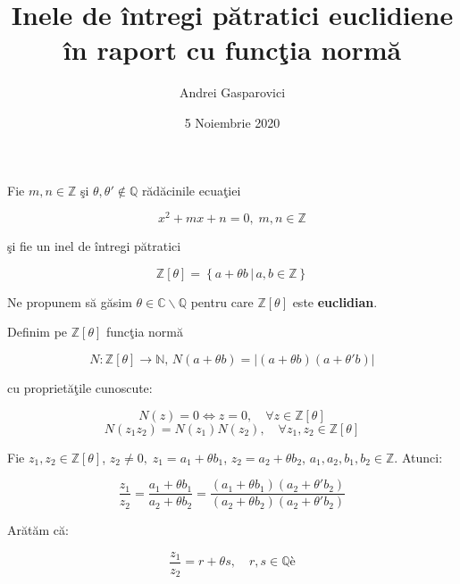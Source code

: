 \documentclass[12pt]{article}
\title{Inele de întregi pătratici euclidiene în raport cu funcţia normă}
\author{Andrei Gasparovici}
\date{5 Noiembrie 2020}
\begin{document}
\maketitle

Fie $m, n \in \mathbb{Z}$ şi $\theta, \theta' \notin \mathbb{Q}$ rădăcinile ecuaţiei

\begin{equation} \label{eq:def_theta}
    x^2 + mx + n = 0, \; m, n \in \mathbb{Z}
\end{equation}

şi fie un inel de întregi pătratici %

\begin{equation} \label{eq:def_z_theta}
    \mathbb{Z}[\theta] = \left\{ a + \theta b \,|\, a, b \in \mathbb{Z}\right\}
\end{equation}

\vspace{.8cm}
Ne propunem să găsim $\theta \in \mathbb{C} \backslash \mathbb{Q}$ pentru care $\mathbb{Z}[\theta]$ este \textbf{euclidian}.
\vspace{.8cm}

Definim pe $\mathbb{Z[\theta]}$ funcţia normă

\begin{equation} \label{eq:def_norm}
    N : \mathbb{Z[\theta]} \to \mathbb{N}, \, N(a + \theta b) = |(a + \theta b)(a + \theta' b)|
\end{equation}

cu proprietăţile cunoscute:

\begin{equation*}
N(z) = 0 \Leftrightarrow z = 0, \quad \forall z \in \mathbb{Z}[\theta]
\end{equation*}
\begin{equation*}
N(z_1 z_2) = N(z_1)N(z_2), \quad \forall z_1, z_2 \in \mathbb{Z}[\theta]
\end{equation*}

Fie $z_1, z_2 \in \mathbb{Z}[\theta]$, $z_2 \neq 0, \; z_1 = a_1 + \theta b_1$, $z_2 = a_2 + \theta b_2$,
$a_1,a_2,b_1,b_2 \in \mathbb{Z}$. Atunci:

\begin{equation} \label{eq:ratio}
    \frac{z_1}{z_2} = \frac{a_1 + \theta b_1}{a_2 + \theta b_2} = 
    \frac{(a_1 + \theta b_1)(a_2 + \theta' b_2)}{(a_2 + \theta b_2)(a_2 + \theta' b_2)}
\end{equation}

Arătăm că:

\begin{equation*}
    \frac{z_1}{z_2} = r + \theta s, \quad r, s \in \mathbb{Q}è
\end{equation*}
\end{document}
